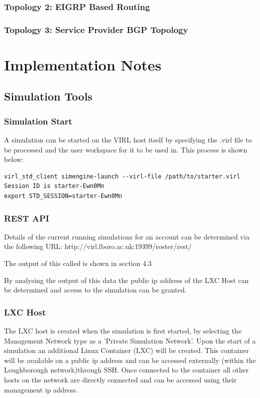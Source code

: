 \documentclass[11pt]{report}
\begin{document}
\subsection{Topology 2: EIGRP Based Routing}

\subsection{Topology 3: Service Provider BGP Topology}

\chapter*{Implementation Notes}

\section*{Simulation Tools}

\subsection*{Simulation Start}

A simulation can be started on the VIRL host itself by specifying the .virl file to be processed and the user workspace for it to be used in. This process is shown below:

\begin{lstlisting}
virl_std_client simengine-launch --virl-file /path/to/starter.virl
Session ID is starter-Ewn0Mn
export STD_SESSION=starter-Ewn0Mn
\end{lstlisting}

\subsection*{REST API}

Details of the current running simulations for an account can be determined via the following URL: http://virl.lboro.ac.uk:19399/roster/rest/

The output of this called is shown in section 4.3

By analysing the output of this data the public ip address of the LXC Host can be determined and access to the simulation can be granted.

\subsection*{LXC Host}

The LXC host is created when the simulation is first started, by selecting the Management Network type as a 'Private Simulation Network'. Upon the start of a simulation an additional Linux Container (LXC) will be created. This container will be available on a public ip address and can be accessed externally (within the Loughborough network)through SSH. Once connected to the container all other hosts on the network are directly connected and can be accessed using their management ip address.
\end{document}
